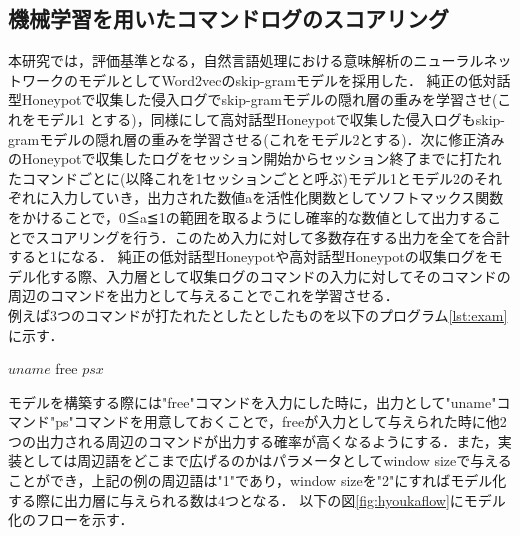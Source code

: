 \subsection{機械学習を用いたコマンドログのスコアリング}
\label{eval:impl}
本研究では，評価基準となる，自然言語処理における意味解析のニューラルネットワークのモデルとしてWord2vecのskip-gramモデルを採用した．
純正の低対話型Honeypotで収集した侵入ログでskip-gramモデルの隠れ層の重みを学習させ(これをモデル1
とする)，同様にして高対話型Honeypotで収集した侵入ログもskip-gramモデルの隠れ層の重みを学習させる(これをモデル2とする)．次に修正済みのHoneypotで収集したログをセッション開始からセッション終了までに打たれたコマンドごとに(以降これを1セッションごとと呼ぶ)モデル1とモデル2のそれぞれに入力していき，出力された数値aを活性化関数としてソフトマックス関数をかけることで，0≦a≦1の範囲を取るようにし確率的な数値として出力することでスコアリングを行う．このため入力に対して多数存在する出力を全てを合計すると1になる．
純正の低対話型Honeypotや高対話型Honeypotの収集ログをモデル化する際、入力層として収集ログのコマンドの入力に対してそのコマンドの周辺のコマンドを出力として与えることでこれを学習させる．\\
例えば3つのコマンドが打たれたとしたとしたものを以下のプログラム\ref{lst:exam}に示す．

\vspace{5mm}

\begin{mylisting}[label=exam,language=sh,caption=3つの実行コマンドの例]
 $ uname
 $ free
 $ ps x
 $
\end{mylisting}
\vspace{5mm}

モデルを構築する際には"free"コマンドを入力にした時に，出力として"uname"コマンド"ps"コマンドを用意しておくことで，freeが入力として与えられた時に他2つの出力される周辺のコマンドが出力する確率が高くなるようにする．また，実装としては周辺語をどこまで広げるのかはパラメータとしてwindow sizeで与えることができ，上記の例の周辺語は"1"であり，window sizeを"2"にすればモデル化する際に出力層に与えられる数は4つとなる．
以下の図\ref{fig:hyoukaflow}にモデル化のフローを示す．\\

